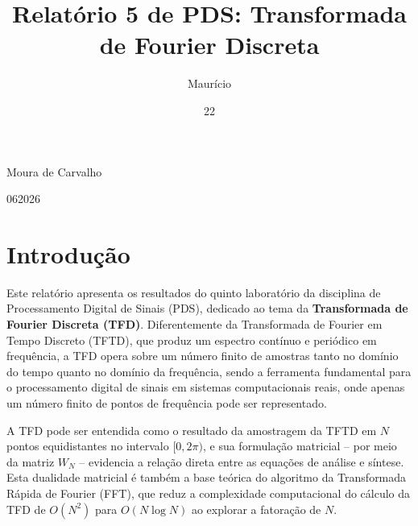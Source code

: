 \documentclass[tcc]{classe_uftex/uftex}
\begin{document}
  \title{Relatório 5 de PDS: Transformada de Fourier Discreta}
  \author{Maurício}{Moura de Carvalho}


  \date{22}{06}{2026}



  \maketitle
  \frontmatter

  \tableofcontents

  \mainmatter
  \setcounter{page}{1}
  \onehalfspacing


\chapter{Introdução}

Este relatório apresenta os resultados do quinto laboratório da disciplina de Processamento Digital de Sinais (PDS), dedicado ao tema da \textbf{Transformada de Fourier Discreta (TFD)}. Diferentemente da Transformada de Fourier em Tempo Discreto (TFTD), que produz um espectro contínuo e periódico em frequência, a TFD opera sobre um número finito de amostras tanto no domínio do tempo quanto no domínio da frequência, sendo a ferramenta fundamental para o processamento digital de sinais em sistemas computacionais reais, onde apenas um número finito de pontos de frequência pode ser representado.

A TFD pode ser entendida como o resultado da amostragem da TFTD em $N$ pontos equidistantes no intervalo $[0, 2\pi)$, e sua formulação matricial -- por meio da matriz $W_N$ -- evidencia a relação direta entre as equações de análise e síntese. Esta dualidade matricial é também a base teórica do algoritmo da Transformada Rápida de Fourier (FFT), que reduz a complexidade computacional do cálculo da TFD de $O(N^2)$ para $O(N\log N)$ ao explorar a fatoração de $N$.
\end{document}
